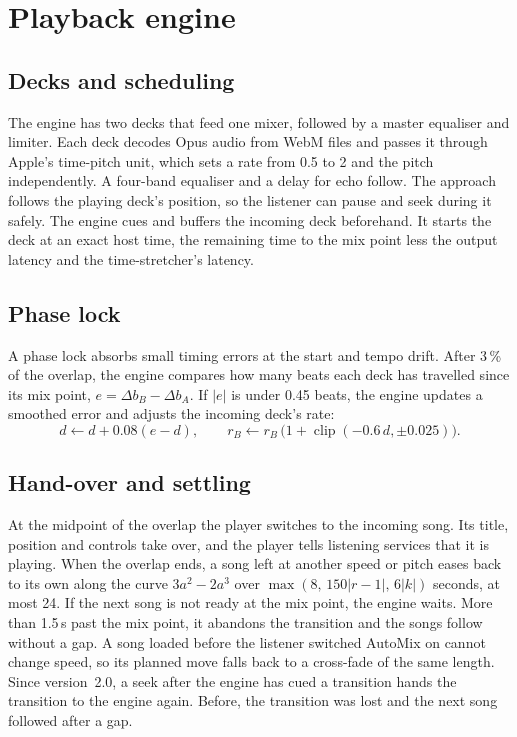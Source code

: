 \documentclass[conference,a4paper]{IEEEtran}
\begin{document}
\section{Playback engine}\label{sec:engine}

\subsection{Decks and scheduling}
The engine has two decks that feed one mixer, followed by a master equaliser and limiter. Each deck
decodes Opus audio from WebM files and passes it through Apple's time-pitch unit, which sets a rate
from 0.5 to 2 and the pitch independently. A four-band equaliser and a delay for echo follow. The
approach follows the playing deck's position, so the listener can pause and seek during it safely.
The engine cues and buffers the incoming deck beforehand. It starts the deck at an exact host time,
the remaining time to the mix point less the output latency and the time-stretcher's latency.

\subsection{Phase lock}
A phase lock absorbs small timing errors at the start and tempo drift. After 3\,\% of the overlap,
the engine compares how many beats each deck has travelled since its mix point,
$e=\Delta b_B-\Delta b_A$. If $|e|$ is under 0.45 beats, the engine updates a smoothed error and
adjusts the incoming deck's rate:
\begin{equation}
d\leftarrow d+0.08(e-d),\qquad
r_B\leftarrow r_B\,\bigl(1+\operatorname{clip}(-0.6\,d,\pm0.025)\bigr).
\end{equation}

\subsection{Hand-over and settling}
At the midpoint of the overlap the player switches to the incoming song. Its title, position and
controls take over, and the player tells listening services that it is playing. When the overlap
ends, a song left at another speed or pitch eases back to its own along the curve $3a^2-2a^3$ over
$\max(8,\,150|r-1|,\,6|k|)$ seconds, at most 24. If the next song is not ready at the mix point, the
engine waits. More than 1.5\,s past the mix point, it abandons the transition and the songs follow
without a gap. A song loaded before the listener switched AutoMix on cannot change speed, so its
planned move falls back to a cross-fade of the same length. Since version~2.0, a seek after the
engine has cued a transition hands the transition to the engine again. Before, the transition was
lost and the next song followed after a gap.
\end{document}
